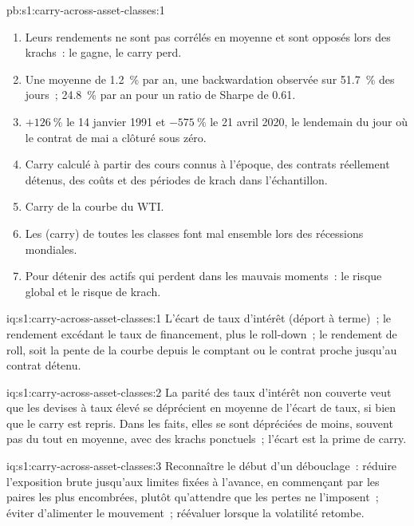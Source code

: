 \begin{solution}{pb:s1:carry-across-asset-classes:1}
\begin{enumerate}
krach, il a perdu 26.3~\% à 10~\% de volatilité, davantage que chaque classe prise seule (devises 24.9~\%, actions 12.4~\%, matières premières 11.3~\%, obligations 4.1~\%).
\item Leurs rendements ne sont pas corrélés en moyenne et sont opposés lors des krachs~: le  gagne, le carry perd.
\item Une moyenne de 1.2~\% par an, une backwardation observée sur 51.7~\% des jours~; 24.8~\% par an pour un ratio de Sharpe de 0.61.
\item $+126~\%$ le 14 janvier 1991 et $-575~\%$ le 21 avril 2020, le lendemain du jour où le contrat de mai a clôturé sous zéro.
\item Carry calculé à partir des cours connus à l'époque, des contrats réellement détenus, des coûts et des périodes de krach dans l'échantillon.
\item Carry de la courbe du WTI.
\item Les  (carry) de toutes les classes font mal ensemble lors des récessions mondiales.
\item Pour détenir des actifs qui perdent dans les mauvais moments~: le risque global et le risque de krach.
\end{enumerate}
\end{solution}

\begin{solution}{iq:s1:carry-across-asset-classes:1}
L'écart de taux d'intérêt (déport à terme)~; le rendement excédant le taux de financement, plus le roll-down~; le rendement de roll, soit la pente de la courbe depuis le
comptant ou le contrat proche jusqu'au contrat détenu.
\end{solution}

\begin{solution}{iq:s1:carry-across-asset-classes:2}
La parité des taux d'intérêt non couverte veut que les devises à taux élevé se déprécient en moyenne de l'écart de taux, si bien que le carry est repris. Dans les faits, elles se sont
dépréciées de moins, souvent pas du tout en moyenne, avec des krachs ponctuels~; l'écart est la prime de carry.
\end{solution}

\begin{solution}{iq:s1:carry-across-asset-classes:3}
Reconnaître le début d'un débouclage~: réduire l'exposition brute jusqu'aux limites fixées à l'avance, en commençant par les paires les plus encombrées, plutôt qu'attendre que les pertes
ne l'imposent~; éviter d'alimenter le mouvement~; réévaluer lorsque la volatilité retombe.
\end{solution}

